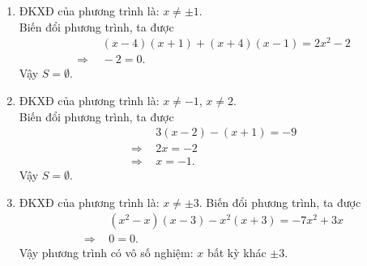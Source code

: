 \begin{bt}
{\begin{enumerate}
	Biến đổi phương trình, ta được
	\begin{align*}
	& \ 6(x-8)+(x+2)(x-5)=-18-(x-5)(x-8)\\
	\Rightarrow\, & \ 2x^2-10x=0\\
	\Rightarrow\, & \ \hoac {&x=0 \\ &x=5} .
	\end{align*}
	Vì $x=5$ bị loại nên $S=\{0\}$.
	\item ĐKXĐ của phương trình là: $x \neq \pm 1$.\\
	Biến đổi phương trình, ta được
	\begin{align*}
	& \ (x-4)(x+1)+(x+4)(x-1)=2x^2-2\\
	\Rightarrow\, & \ -2=0.
	\end{align*}
	Vậy $S= \emptyset$.
	\item ĐKXĐ của phương trình là: $x \neq - 1$, $x \neq 2$.\\
	Biến đổi phương trình, ta được
	\begin{align*}
	& \ 3(x-2)-(x+1)=-9\\
	\Rightarrow\, & \ 2x=-2\\
	\Rightarrow\, & \ x=-1.
	\end{align*}
	Vậy $S= \emptyset$.
	\item ĐKXĐ của phương trình là: $x \neq \pm 3$.
	Biến đổi phương trình, ta được
	\begin{align*}
	& \ (x^2-x)(x-3)-x^2(x+3)=-7x^2+3x\\
	\Rightarrow\, & \ 0=0.
	\end{align*}
	Vậy phương trình có vô số nghiệm: $x$ bất kỳ khác $ \pm 3$.
	\end{enumerate}
	}
\end{bt}
